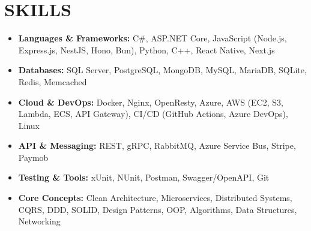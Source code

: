\documentclass[letterpaper, 11pt]{article}
\begin{document}
\section{SKILLS}
\vspace{0.5em}
\begin{itemize}[leftmargin=1.5em, nosep, itemsep=0.2em]

\item \textbf{Languages \& Frameworks:} \small{C\#, ASP.NET Core, JavaScript (Node.js, Express.js, NestJS, Hono, Bun), Python, C++, React Native, Next.js}

\item \textbf{Databases:} \small{SQL Server, PostgreSQL, MongoDB, MySQL, MariaDB, SQLite, Redis, Memcached}

\item \textbf{Cloud \& DevOps:} \small{Docker, Nginx, OpenResty, Azure, AWS (EC2, S3, Lambda, ECS, API Gateway), CI/CD (GitHub Actions, Azure DevOps), Linux}

\item \textbf{API \& Messaging:} \small{REST, gRPC, RabbitMQ, Azure Service Bus, Stripe, Paymob}

\item \textbf{Testing \& Tools:} \small{xUnit, NUnit, Postman, Swagger/OpenAPI, Git}

\item \textbf{Core Concepts:} \small{Clean Architecture, Microservices, Distributed Systems, CQRS, DDD, SOLID, Design Patterns, OOP, Algorithms, Data Structures, Networking}

\end{itemize}
\end{document}
